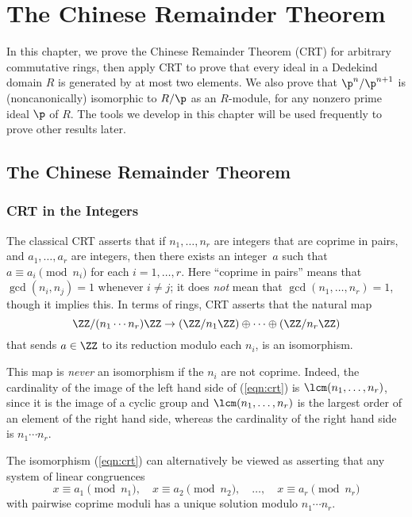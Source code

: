 \chapter{The Chinese Remainder Theorem}\label{ch:crt}

In this chapter, we prove the Chinese Remainder Theorem (CRT) for
arbitrary commutative rings, then apply CRT to prove that every ideal
in a Dedekind domain $R$ is generated by at most two elements.  We
also prove that $\p^n/\p^{n+1}$ is (noncanonically) isomorphic to
$R/\p$ as an $R$-module, for any nonzero prime ideal $\p$ of $R$.  The
tools we develop in this chapter will be used frequently to prove
other results later.

\section{The Chinese Remainder Theorem}

\subsection{CRT in the Integers}
The classical CRT asserts that if $n_1, \dots, n_r$ are integers that are coprime
in pairs, and $a_1, \dots, a_r$ are integers, then there exists an
integer~$a$ such that $a \equiv a_i\pmod{n_i}$ for each $i=1, \dots,r$.
Here ``coprime in pairs'' means that $\gcd(n_i,n_j)=1$ whenever
$i\neq j$; it does {\em not} mean that $\gcd(n_1, \dots, n_r)=1$,
though it implies this.
In terms of rings, CRT asserts that the
natural map
\begin{equation}\label{eqn:crt}
\ZZ/(n_1\cdots n_r)\ZZ \to (\ZZ/n_1\ZZ)\oplus \cdots \oplus (\ZZ/n_r\ZZ)
\end{equation}
that sends $a \in \ZZ$ to its reduction modulo each $n_i$,
is an isomorphism.

This map is {\em never} an isomorphism if the $n_i$ are not coprime.
Indeed, the cardinality of the image of the left hand side of
(\ref{eqn:crt}) is $\lcm(n_1, \dots, n_r)$, since it is the image of a
cyclic group and $\lcm(n_1, \dots, n_r)$ is the largest order of an
element of the right hand side, whereas the cardinality of the right
hand side is $n_1\cdots n_r$.

The isomorphism (\ref{eqn:crt}) can alternatively be viewed as
asserting that any system of linear congruences
$$
x \equiv a_1 \pmod{n_1}, \quad
x \equiv a_2 \pmod{n_2}, \quad
\dots, \quad
x \equiv a_r \pmod{n_r}
$$
with pairwise coprime moduli has a unique solution modulo $n_1\cdots n_r$.

